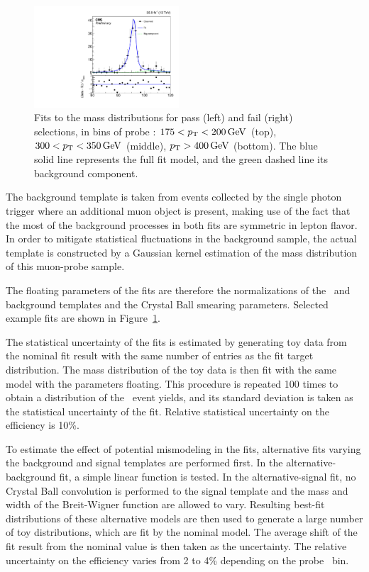 \begin{figure}[htbp]
\begin{center}
    \includegraphics[width=0.48\textwidth]{Calibration/Figures/idsf/fit_data_fail_pt_400_6500.pdf}
    \caption{
      Fits to the mass distributions for pass (left) and fail (right) selections, in bins of probe \pt: 
      $175 < p_{\mathrm{T}} < 200\,\text{Ge\hspace{-.08em}V}$ (top), 
      $300 < p_{\mathrm{T}} < 350\,\text{Ge\hspace{-.08em}V}$ (middle), 
      $p_{\mathrm{T}} > 400\,\text{Ge\hspace{-.08em}V}$ (bottom). 
      The blue solid line represents the full fit model, and the green dashed line its background component.
    }
    \label{fig:idsf_fits}
  \end{center}
\end{figure}

The background template is taken from events collected by the single photon trigger where an additional muon object is present, making use of the fact that the most of the background processes in both fits are symmetric in lepton flavor. 
In order to mitigate statistical fluctuations in the background sample, the actual template is constructed by a Gaussian kernel estimation of the mass distribution of this muon-probe sample. %

The floating parameters of the fits are therefore the normalizations of the \Zee\ and background templates and the Crystal Ball smearing parameters. 
Selected example fits are shown in Figure~\ref{fig:idsf_fits}.

The statistical uncertainty of the fits is estimated by generating toy data from the nominal fit result with the same number of entries as the fit target distribution. 
The mass distribution of the toy data is then fit with the same model with the parameters floating. 
This procedure is repeated 100 times to obtain a distribution of the \Zee\ event yields, and its standard deviation is taken as the statistical uncertainty of the fit. 
Relative statistical uncertainty on the efficiency is 10\%. %

To estimate the effect of potential mismodeling in the fits, alternative fits varying the background and signal templates are performed first. 
In the alternative-background fit, a simple linear function is tested.
In the alternative-signal fit, no Crystal Ball convolution is performed to the signal template and the mass and width of the Breit-Wigner function are allowed to vary. 
Resulting best-fit distributions of these alternative models are then used to generate a large number of toy distributions, which are fit by the nominal model. 
The average shift of the fit result from the nominal value is then taken as the uncertainty.
The relative uncertainty on the efficiency varies from 2 to 4\% depending on the probe \pt\ bin. %

